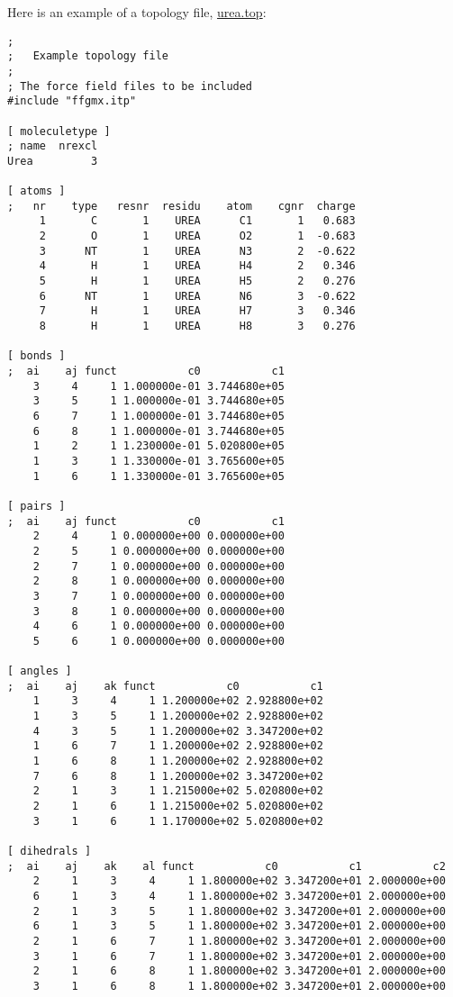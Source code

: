 Here is an example of a topology file, \underline{urea.top}:
{\small
\begin{verbatim}
;
;	Example topology file
;
; The force field files to be included
#include "ffgmx.itp"	

[ moleculetype ]
; name  nrexcl
Urea         3

[ atoms ]
;   nr    type   resnr  residu    atom    cgnr  charge
     1       C       1    UREA      C1       1   0.683	
     2       O       1    UREA      O2       1	-0.683
     3      NT       1    UREA      N3       2	-0.622
     4       H       1    UREA      H4       2	 0.346
     5       H       1    UREA      H5       2	 0.276
     6      NT       1    UREA      N6       3	-0.622
     7       H       1    UREA      H7       3   0.346
     8       H       1    UREA      H8       3	 0.276

[ bonds ]
;  ai    aj funct           c0           c1
    3     4     1 1.000000e-01 3.744680e+05 
    3     5     1 1.000000e-01 3.744680e+05 
    6     7     1 1.000000e-01 3.744680e+05 
    6     8     1 1.000000e-01 3.744680e+05 
    1     2     1 1.230000e-01 5.020800e+05 
    1     3     1 1.330000e-01 3.765600e+05 
    1     6     1 1.330000e-01 3.765600e+05 

[ pairs ]
;  ai    aj funct           c0           c1
    2     4     1 0.000000e+00 0.000000e+00 
    2     5     1 0.000000e+00 0.000000e+00 
    2     7     1 0.000000e+00 0.000000e+00 
    2     8     1 0.000000e+00 0.000000e+00 
    3     7     1 0.000000e+00 0.000000e+00 
    3     8     1 0.000000e+00 0.000000e+00 
    4     6     1 0.000000e+00 0.000000e+00 
    5     6     1 0.000000e+00 0.000000e+00 

[ angles ]
;  ai    aj    ak funct           c0           c1
    1     3     4     1 1.200000e+02 2.928800e+02 
    1     3     5     1 1.200000e+02 2.928800e+02 
    4     3     5     1 1.200000e+02 3.347200e+02 
    1     6     7     1 1.200000e+02 2.928800e+02 
    1     6     8     1 1.200000e+02 2.928800e+02 
    7     6     8     1 1.200000e+02 3.347200e+02 
    2     1     3     1 1.215000e+02 5.020800e+02 
    2     1     6     1 1.215000e+02 5.020800e+02 
    3     1     6     1 1.170000e+02 5.020800e+02 

[ dihedrals ]
;  ai    aj    ak    al funct           c0           c1           c2
    2     1     3     4     1 1.800000e+02 3.347200e+01 2.000000e+00 
    6     1     3     4     1 1.800000e+02 3.347200e+01 2.000000e+00 
    2     1     3     5     1 1.800000e+02 3.347200e+01 2.000000e+00 
    6     1     3     5     1 1.800000e+02 3.347200e+01 2.000000e+00 
    2     1     6     7     1 1.800000e+02 3.347200e+01 2.000000e+00 
    3     1     6     7     1 1.800000e+02 3.347200e+01 2.000000e+00 
    2     1     6     8     1 1.800000e+02 3.347200e+01 2.000000e+00 
    3     1     6     8     1 1.800000e+02 3.347200e+01 2.000000e+00 


\end{verbatim}}
